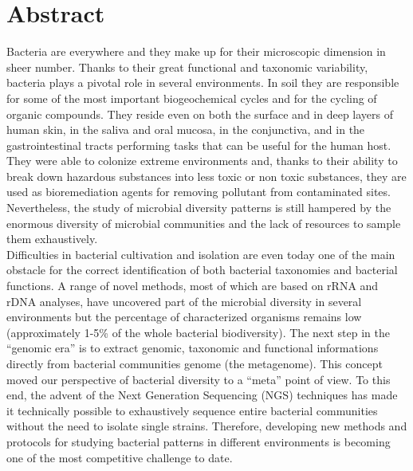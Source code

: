 \chapter{Abstract}
Bacteria are everywhere and they make up for their microscopic dimension in sheer number. Thanks to their great functional and taxonomic variability, bacteria plays a pivotal role in several environments. In soil they are responsible for some of the most important biogeochemical cycles and for the cycling of organic compounds. They reside even on both the surface and in deep layers of human skin, in the saliva and oral mucosa, in the conjunctiva, and in the gastrointestinal tracts performing tasks that can be useful for the human host. They were able to colonize extreme environments and, thanks to their ability to break down hazardous substances into less toxic or non toxic substances, they are used as bioremediation agents for removing pollutant from contaminated sites. Nevertheless, the study of microbial diversity patterns is still hampered by the enormous diversity of microbial communities and the lack of resources to sample them exhaustively.\\
Difficulties in bacterial cultivation and isolation are even today one of the main obstacle for the correct identification of both bacterial taxonomies and bacterial functions. A range of novel methods, most of which are based on rRNA and rDNA analyses, have uncovered part of the microbial diversity in several environments but the percentage of characterized organisms remains low (approximately 1-5\% of the whole bacterial biodiversity). The next step in the ``genomic era'' is to extract genomic, taxonomic and functional informations directly from bacterial communities genome (the metagenome). This concept moved our perspective of bacterial diversity to a ``meta'' point of view. To this end, the advent of the Next Generation Sequencing (NGS) techniques has made it technically possible to exhaustively sequence entire bacterial communities without the need to isolate single strains. Therefore, developing new methods and protocols for studying bacterial patterns in different environments is becoming one of the most competitive challenge to date.\\
